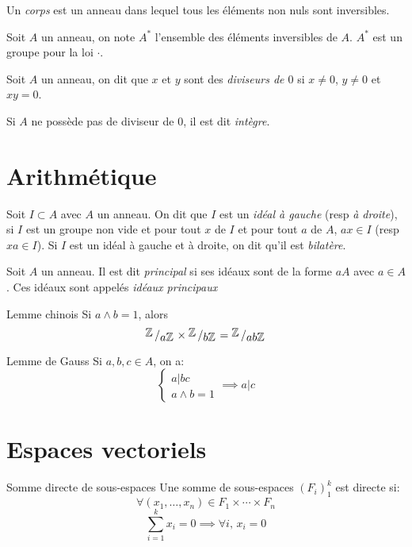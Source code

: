 \documentclass[french, a4paper, 11pt, twocolumn]{article}
\newcommand{\bigslant}[2]{{\raisebox{.2em}{\(#1\)}\left/\raisebox{-.2em}{\(#2\)}\right.}}
\newcommand{\Z}{\mathbb{Z}}   %
\begin{document}
\begin{definition}
  Un \emph{corps} est un anneau dans lequel tous les éléments non nuls sont inversibles.

  Soit \(A\) un anneau, on note \(A^{*}\) l'ensemble des éléments inversibles de \(A\). \(A^{*}\) est un groupe pour la loi \(\cdot\).
\end{definition}

\begin{definition}
  Soit \(A\) un anneau, on dit que \(x\) et \(y\) sont des \emph{diviseurs de \(0\)} si \(x\neq 0\), \(y\neq 0\) et \(xy=0\).

  Si \(A\) ne possède pas de diviseur de \(0\), il est dit \emph{intègre}.
\end{definition}

\section{Arithmétique}
\begin{definition}
  Soit \(I\subset A\) avec \(A\) un anneau. On dit que \(I\) est un \emph{idéal à gauche} (resp \emph{à droite}), si \(I\) est un groupe non vide et pour tout \(x\) de \(I\) et pour tout \(a\) de \(A\), \(ax\in I\) (resp \(xa \in I\)). Si \(I\) est un idéal à gauche et à droite, on dit qu'il est \emph{bilatère}.
\end{definition}

\begin{definition}
  Soit \(A\) un anneau. Il est dit \emph{principal} si ses idéaux sont de la forme \(aA\) avec \(a\in A\). Ces idéaux sont appelés \emph{idéaux principaux}
\end{definition}

\begin{theoreme}{Lemme chinois}
  Si \(a \wedge b = 1\), alors
  \[\bigslant{\Z}{a\Z}\times\bigslant{\Z}{b\Z} = \bigslant{\Z}{ab\Z}\]
\end{theoreme}

\begin{theoreme}{Lemme de Gauss}
  Si \(a,b,c\in A\), on a:
  \[\begin{cases}
      a|bc\\
      a\wedge b = 1
    \end{cases}\implies a|c\]
\end{theoreme}

\section{Espaces vectoriels}
\begin{theoreme}{Somme directe de sous-espaces}
  Une somme de sous-espaces \((F_{i})_{1}^{k}\) est directe si:
  \[\forall (x_{1},\ldots,x_{n}) \in F_{1}\times \cdots\times F_{n}\]
  \[\sum_{i=1}^k x_{i} = 0 \implies \forall i,\, x_{i}=0\]
\end{theoreme}
\end{document}
